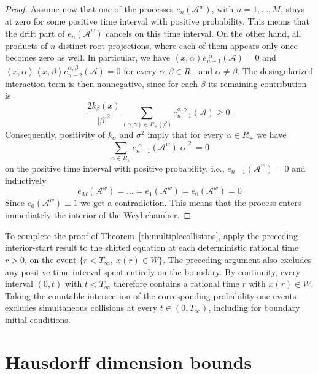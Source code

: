 \documentclass{article}
\numberwithin{equation}{section}
\newcommand{\C}{W}
\newcommand{\Aaclear}{\mathcal{A}}
\newcommand{\Aa}{\mathcal{A}^{w}}
\newcommand{\xa}{\left<x,\alpha\right>}
\newcommand{\xb}{\left<x,\beta\right>}
\newcommand{\aR}{\alpha\in R_+}
\newcommand{\shift}{\,\,}
\newcommand{\eA}[1]{e_{#1}(\Aa)}
\newcommand{\eaA}[1]{e_{#1}^{\shift\overline{\alpha}}(\Aa)}
\newcommand{\eaAc}[1]{e_{#1}^{\shift\overline{\alpha}}(\Aaclear)}
\newcommand{\eabAc}[1]{e_{#1}^{\overline{\alpha}, \overline{\beta}}(\Aaclear)}
\newcommand{\eacAc}[1]{e_{#1}^{\overline{\alpha}, \overline{\gamma}}(\Aaclear)}
\theoremstyle{plain}
\begin{document}
\begin{proof}
    Assume now that one of the processes $\eA{n}$, with $n=1,\ldots, M$, stays at zero for some positive time interval with positive probability. This means that the drift part of $\eA{n}$ cancels on this time interval. On the other hand, all products of $n$ distinct root projections, where each of them appears only once becomes zero as well. In particular, we have $\xa \eaAc{n-1} = 0$ and $\xa\xb\eabAc{n-2} = 0$ for every $\alpha,\beta \in R_+$ and $\alpha\neq \beta$. The desingularized interaction term is then nonnegative, since for each $\beta$ its remaining contribution is
    \begin{equation*}
        \frac{2k_\beta(x)}{|\beta|^2} \sum_{(\alpha,\gamma)\in R_+(\beta)} \eacAc{n-1}\geq0.
    \end{equation*}
Consequently, positivity of $k_\alpha$ and $\sigma^2$ imply that for every $\alpha\in R_+$ we have
        \begin{equation*}
            \sum_{\aR}   \eaA{n-1} |\alpha|^2 \ = 0
        \end{equation*}
    on the positive time interval with positive probability, i.e., $\eA{n-1}=0$ and inductively 
        \begin{equation*}
            \eA{M} = \ldots = \eA{1} = \eA{0} = 0
        \end{equation*}
    Since $\eA{0}\equiv 1$ we get a contradiction. This means that the process enters immediately the interior of the Weyl chamber.
\end{proof}

To complete the proof of Theorem~\ref{th:multiplecollisions},
apply the preceding interior-start result to the shifted equation at each deterministic rational time $r>0$, on the event $\{r<T_\infty,\ x(r)\in\C\}$. The preceding argument also excludes any positive time interval spent entirely on the boundary. By continuity, every interval $(0,t)$ with $t<T_\infty$ therefore contains a rational time $r$ with $x(r)\in\C$. Taking the countable intersection of the corresponding probability-one events excludes simultaneous collisions at every $t\in(0,T_\infty)$, including for boundary initial conditions.


\section{Hausdorff dimension bounds}\label{sec:dimensionbounds}
\end{document}

